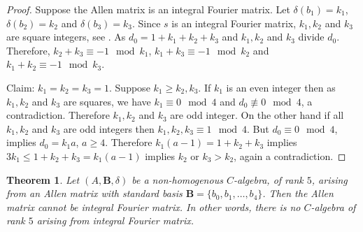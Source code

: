 \documentclass[12pt]{amsart}
\newtheorem{thm}{Theorem}
\begin{document}
\begin{proof} Suppose the Allen matrix is an integral Fourier matrix. Let $\delta(b_1)= k_1$, $\delta(b_2)=k_2$  and $\delta(b_3)=k_3$. Since $s$ is an integral Fourier matrix, $k_1, k_2$ and $k_3$ are square integers, see \cite[Lemma 12]{G1}. As $d_0=1+k_1+k_2+k_3$ and
$k_1, k_2$ and $k_3$ divide $d_0$. Therefore, $k_2+k_3\equiv-1\mod k_1$, $k_1+k_3\equiv-1\mod k_2$ and $k_1+k_2\equiv-1\mod k_3$.

Claim: $k_1=k_2=k_3=1$. Suppose $k_1\geq k_2, k_3$. If $k_1$ is an even integer then as $k_1,k_2$ and $k_3$ are squares, we have $k_1\equiv 0 \mod4$ and $d_0\not\equiv 0 \mod4$, a contradiction. Therefore $k_1, k_2$ and $k_3$ are odd integer.
On the other hand if all $k_1,k_2$ and $k_3$ are odd integers then
$k_1,k_2,k_3\equiv 1 \mod4$. But $d_0\equiv 0\mod4$, implies $d_0=k_1a$, $a\geq 4$. Therefore $k_1(a-1)=1+k_2+k_3$ implies $3k_1\leq 1+k_2+k_3=k_1(a-1)$ implies $k_2$ or $k_3>k_2$, again a contradiction.
\end{proof}

\begin{thm}\label{FourDifferentDegreesThm5}Let $(A,{{\mathbf B}}, \delta)$ be a non-homogenous $C$-algebra, of rank $5$, arising from an Allen matrix with standard  basis ${{\mathbf B}}=\{b_0,b_1,\hdots, b_4\}$. Then the Allen matrix cannot be integral Fourier matrix. In other words, there is no $C$-algebra of rank $5$ arising from integral Fourier matrix.
\end{thm}
\end{document}
